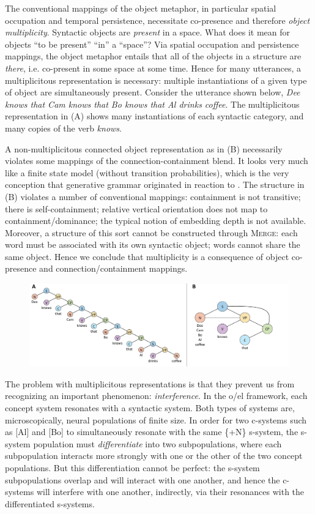 The conventional mappings of the object metaphor, in particular spatial occupation and temporal persistence, necessitate co-presence and therefore \textit{object multiplicity}. Syntactic objects are \textit{present} in a space. What does it mean for objects “to be present” “in” a “space”? Via spatial occupation and persistence mappings, the object metaphor entails that all of the objects in a structure are \textit{there}, i.e. co-present in some space at some time. Hence for many utterances, a multiplicitous representation is necessary: multiple instantiations of a given type of object are simultaneously present. Consider the utterance shown below, \textit{Dee knows that Cam knows that Bo knows that Al drinks coffee}. The multiplicitous representation in (A) shows many instantiations of each syntactic category, and many copies of the verb \textit{knows}.

  A non-multiplicitous connected object representation as in (B) necessarily violates some mappings of the connection-containment blend. It looks very much like a finite state model (without transition probabilities), which is the very conception that generative grammar originated in reaction to \citep{Chomsky1956}. The structure in (B) violates a number of conventional mappings: containment is not transitive; there is self-containment; relative vertical orientation does not map to containment/dominance; the typical notion of embedding depth is not available. Moreover, a structure of this sort cannot be constructed through \textsc{Merge}: each word must be associated with its own syntactic object; words cannot share the same object. Hence we conclude that multiplicity is a consequence of object co-presence and connection/containment mappings.

  
\begin{figure}
\includegraphics[width=\textwidth]{figures/Tilsen-img36.png}
\caption{\missingcaption}
\label{fig:}
\end{figure}
 

  The problem with multiplicitous representations is that they prevent us from recognizing an important phenomenon: \textit{interference}. In the o/el framework, each concept system resonates with a syntactic system. Both types of systems are, microscopically, neural populations of finite size. In order for two c-systems such as [Al] and [Bo] to simultaneously resonate with the same \{+N\} s-system, the s-system population must \textit{differentiate} into two subpopulations, where each subpopulation interacts more strongly with one or the other of the two concept populations. But this differentiation cannot be perfect: the s-system subpopulations overlap and will interact with one another, and hence the c-systems will interfere with one another, indirectly, via their resonances with the differentiated s-systems. 

